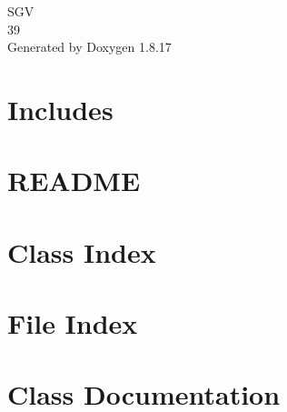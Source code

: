 \let\mypdfximage\pdfximage\def\pdfximage{\immediate\mypdfximage}\documentclass[twoside]{book}
\newcommand{\+}{\discretionary{\mbox{\scriptsize$\hookleftarrow$}}{}{}}
\newcommand{\clearemptydoublepage}{%
  \newpage{\pagestyle{empty}\cleardoublepage}%
}
\begin{document}
\hypersetup{pageanchor=false,
             bookmarksnumbered=true,
             pdfencoding=unicode
            }
\begin{titlepage}
\vspace*{7cm}
\begin{center}%
{\Large S\+GV \\[1ex]\large 39 }\\
\vspace*{1cm}
{\large Generated by Doxygen 1.8.17}\\
\end{center}
\end{titlepage}
\clearemptydoublepage
{}
\tableofcontents
\clearemptydoublepage
{}
\hypersetup{pageanchor=true}

\chapter{Includes}
\label{md__mnt_262729a1-51d5-4621-a6a2-365439ec76db_Universidade_2_xC2_xBA_Ano_2_xC2_xBA_Semestre_LI3_ge74cd7094f51f543ba40069a4959bc0f}

\chapter{R\+E\+A\+D\+ME}
\label{md__mnt_262729a1-51d5-4621-a6a2-365439ec76db_Universidade_2_xC2_xBA_Ano_2_xC2_xBA_Semestre_LI3_grupo39_grupo39_projC_src_README}

\chapter{Class Index}

\chapter{File Index}

\chapter{Class Documentation}



























\end{document}
